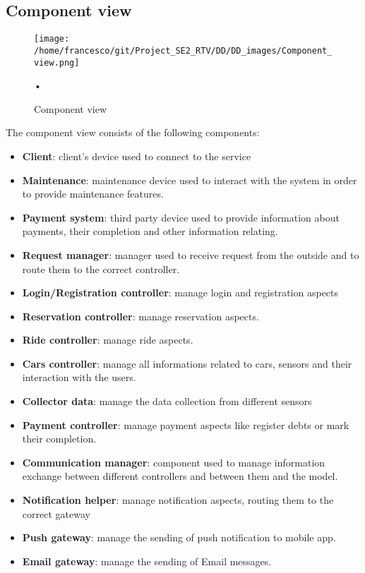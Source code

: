 \documentclass[10pt, a4paper,titlepage]{article}
\begin{document}
\subsection{Component view}
\begin{figure}
\begin{center}
\texttt{[image: /home/francesco/git/Project\_SE2\_RTV/DD/DD\_images/Component\_view.png]}
\caption{Component view}
\label{fig:component_view}
\end{center}•
\end{figure}
The component view consists of the following components:
\begin{itemize}
\item \textbf{Client}: client’s device used to connect to the service
\item \textbf{Maintenance}: maintenance device used to interact with the system in order to provide maintenance features.
\item \textbf{Payment system}: third party device used to provide information about payments, their completion and other information relating.
\item \textbf{Request manager}: manager used to receive request from the outside and to route them to the correct controller. 
\item \textbf{Login/Registration controller}: manage login and registration aspects
\item \textbf{Reservation controller}: manage reservation aspects.
\item \textbf{Ride controller}: manage ride aspects.
\item \textbf{Cars controller}: manage all informations related to cars, sensors and their interaction with the users.
\item \textbf{Collector data}: manage the data collection from different sensors
\item \textbf{Payment controller}: manage payment aspects like register debts or mark their completion.
\item \textbf{Communication manager}: component used to manage information exchange between different controllers and between them and the model.
\item \textbf{Notification helper}: manage notification aspects, routing them to the correct gateway
\item \textbf{Push gateway}: manage the sending of push notification to mobile app.
\item \textbf{Email gateway}: manage the sending of Email messages.

\end{itemize}
\end{document}
